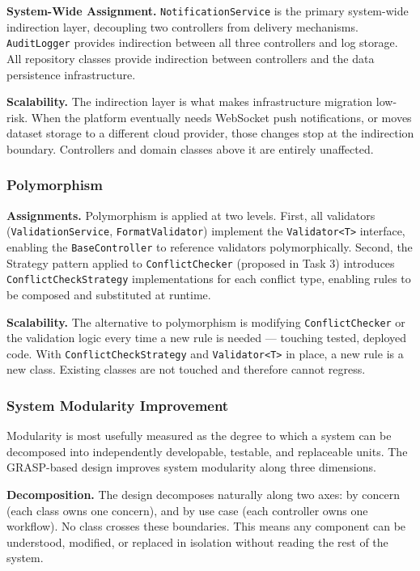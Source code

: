\documentclass[12pt,a4paper]{article}
\newcommand{\code}[1]{\texttt{\small #1}}
\begin{document}
\noindent\textbf{System-Wide Assignment.}
\code{NotificationService} is the primary system-wide indirection layer, decoupling two controllers from delivery mechanisms. \code{AuditLogger} provides indirection between all three controllers and log storage. All repository classes provide indirection between controllers and the data persistence infrastructure.

\noindent\textbf{Scalability.}
The indirection layer is what makes infrastructure migration low-risk. When the platform eventually needs WebSocket push notifications, or moves dataset storage to a different cloud provider, those changes stop at the indirection boundary. Controllers and domain classes above it are entirely unaffected.

\subsubsection{Polymorphism}

\noindent\textbf{Assignments.}
Polymorphism is applied at two levels. First, all validators (\code{ValidationService}, \code{FormatValidator}) implement the \code{Validator<T>} interface, enabling the \code{BaseController} to reference validators polymorphically. Second, the Strategy pattern applied to \code{ConflictChecker} (proposed in Task 3) introduces \code{ConflictCheckStrategy} implementations for each conflict type, enabling rules to be composed and substituted at runtime.

\noindent\textbf{Scalability.}
The alternative to polymorphism is modifying \code{ConflictChecker} or the validation logic every time a new rule is needed --- touching tested, deployed code. With \code{ConflictCheckStrategy} and \code{Validator<T>} in place, a new rule is a new class. Existing classes are not touched and therefore cannot regress.

\subsubsection{System Modularity Improvement}

Modularity is most usefully measured as the degree to which a system can be decomposed into independently developable, testable, and replaceable units. The GRASP-based design improves system modularity along three dimensions.

\noindent\textbf{Decomposition.} The design decomposes naturally along two axes: by concern (each class owns one concern), and by use case (each controller owns one workflow). No class crosses these boundaries. This means any component can be understood, modified, or replaced in isolation without reading the rest of the system.
\end{document}
